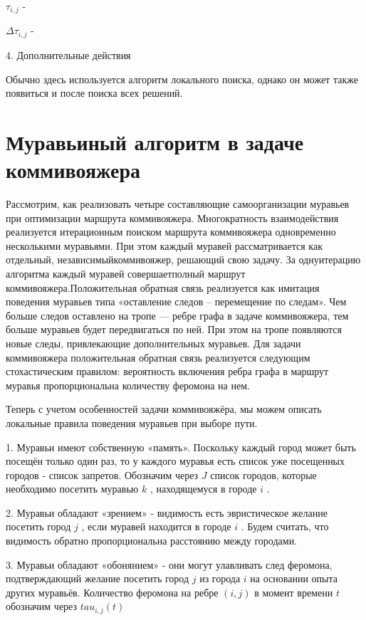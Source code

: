 \documentclass[12pt]{report}
\begin{document}
    $\tau _{i,j}$ -  
    
    $\Delta \tau _{i,j}$ - 

4. Дополнительные действия 

 Обычно здесь используется алгоритм локального поиска, однако    он может также появиться и после поиска всех решений. 

\section{Муравьиный алгоритм в задаче коммивояжера}
Рассмотрим, как реализовать четыре составляющие самоорганизации муравьев при оптимизации маршрута коммивояжера. Многократность взаимодействия реализуется итерационным поиском маршрута коммивояжера одновременно несколькими муравьями. При этом каждый муравей рассматривается как отдельный, независимыйкоммивояжер, решающий свою задачу. За однуитерацию алгоритма каждый муравей совершаетполный маршрут коммивояжера.Положительная обратная связь реализуется как имитация поведения муравьев типа «оставление следов – перемещение по следам». Чем больше следов оставлено на тропе — ребре графа в задаче коммивояжера, тем больше муравьев будет передвигаться по ней. При этом на тропе появляются новые следы, привлекающие дополнительных муравьев. Для задачи коммивояжера положительная обратная связь реализуется следующим стохастическим правилом: вероятность включения ребра графа в маршрут муравья пропорциональна количеству феромона на нем.
		
Теперь с учетом особенностей задачи коммивояжёра, мы можем описать локальные правила поведения муравьев при выборе пути.\
		
	1. Муравьи имеют собственную «память». Поскольку каждый город может быть посещён только один раз, то у каждого муравья есть список уже посещенных городов - список запретов. Обозначим через $J$ список городов, которые необходимо посетить муравью $k$ , находящемуся в городе $i$ . 
	
	2. Муравьи обладают «зрением» - видимость есть эвристическое желание посетить город $j$ , если муравей находится в городе $i$ . Будем считать, что видимость обратно пропорциональна расстоянию между городами. 
	
	3. Муравьи обладают «обонянием» - они могут улавливать след феромона, подтверждающий желание посетить город $j$ из города $i$ на основании опыта других муравьёв. Количество феромона на ребре $(i,j)$ в момент времени $t$ обозначим через  $tau _{i,j} (t)$ 
	
\end{document}
